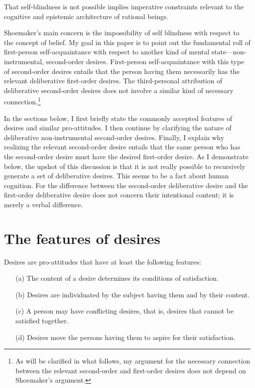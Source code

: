 \documentclass[output=paper,colorlinks,citecolor=brown
]{langscibook}
\begin{document}
That self-blindness is not possible implies imperative constraints relevant to the cognitive and epistemic architecture of rational beings.

Shoemaker’s main concern is the impossibility of self blindness with respect to the concept of belief. My goal in this paper is to point out the fundamental roll of first-person self-acquaintance with respect to another kind of mental state—non-instrumental, second-order desires. First-person self-acquaintance with this type of second-order desires entails that the person having them necessarily has the relevant deliberative first-order desires. The third-personal attribution of deliberative second-order desires does not involve a similar kind of necessary connection.\footnote{As will be clarified in what follows, my argument for the necessary connection between the relevant second-order and first-order desires does not depend on Shoemaker's argument.}
	
	In the sections below, I first briefly state the commonly accepted features of desires and similar pro-attitudes. I then continue by clarifying the nature of deliberative non-instrumental second-order desires. Finally, I explain why realizing the relevant second-order desire entails that the same person who has the second-order desire must have the desired first-order desire. As I demonstrate below, the upshot of this discussion is that it is not really possible to recursively generate a set of deliberative desires. This seems to be a fact about human cognition. For the difference between the second-order deliberative desire and the first-order deliberative desire does not concern their intentional content; it is merely a verbal difference.
	
\section{The features of desires}

Desires are pro-attitudes that have at least the following features:

\begin{itemize}
\item[(a)]	The content of a desire determines its conditions of satisfaction. 

\item[(b)]	Desires are individuated by the subject having them and by their content.

\item[(c)]	A person may have conflicting desires, that is, desires that cannot be satisfied together. 

\item[(d)]	Desires move the persons having them to aspire for their satisfaction.
\end{itemize}
\end{document}
